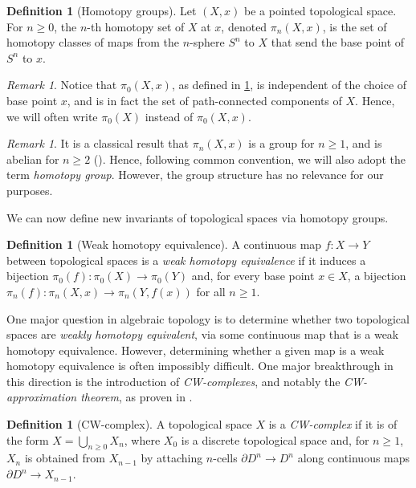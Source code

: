 \documentclass[11pt, a4paper]{amsart}
\theoremstyle{definition}
\newtheorem{definition}[equation]{Definition}
\theoremstyle{remark}
\newtheorem{remark}[equation]{Remark}
\numberwithin{equation}{section}
\begin{document}
\begin{definition}[Homotopy groups] \label{def:homotopy groups}
  Let $(X,x)$ be a pointed topological space. For $n \geq 0$, the $n$-th homotopy set of $X$ at $x$, denoted $\pi_n(X,x)$, is the set of homotopy classes of maps from the $n$-sphere $S^n$ to $X$ that send the base point of $S^n$ to $x$.
\end{definition}

\begin{remark}
  Notice that $\pi_0(X,x)$, as defined in \cref{def:homotopy groups}, is independent of the choice of base point $x$, and is in fact the set of path-connected components of $X$. Hence, we will often write $\pi_0(X)$ instead of $\pi_0(X,x)$.
\end{remark}

\begin{remark}
  It is a classical result that $\pi_n(X,x)$ is a group for $n \geq 1$, and is abelian for $n \geq 2$ (\cite[Section 4.1]{hatcher2002at}). Hence, following common convention, we will also adopt the term \emph{homotopy group}. However, the group structure has no relevance for our purposes.
\end{remark}

We can now define new invariants of topological spaces via homotopy groups.

\begin{definition}[Weak homotopy equivalence] \label{def:weak homotopy equivalence}
  A continuous map $f\colon X \to Y$ between topological spaces is a \emph{weak homotopy equivalence} if it induces a bijection $\pi_0(f)\colon \pi_0(X) \to \pi_0(Y)$ and, for every base point $x \in X$,  a bijection $\pi_n(f)\colon \pi_n(X,x) \to \pi_n(Y,f(x))$ for all $n \geq 1$.
\end{definition}

One major question in algebraic topology is to determine whether two topological spaces are \emph{weakly homotopy equivalent}, via some continuous map that is a weak homotopy equivalence. However, determining whether a given map is a weak homotopy equivalence is often impossibly difficult. One major breakthrough in this direction is the introduction of \emph{CW-complexes}, and notably the \emph{CW-approximation theorem}, as proven in \cite[Proposition 4.13]{hatcher2002at}.

\begin{definition}[CW-complex]
  A topological space $X$ is a \emph{CW-complex} if it is of the form $X = \bigcup_{n \geq 0} X_n$, where $X_0$ is a discrete topological space and, for $n \geq 1$, $X_{n}$ is obtained from $X_{n-1}$ by attaching $n$-cells $\partial D^{n} \to D^{n}$ along continuous maps $\partial D^n \to X_{n-1}$. 
\end{definition}
  
\end{document}
